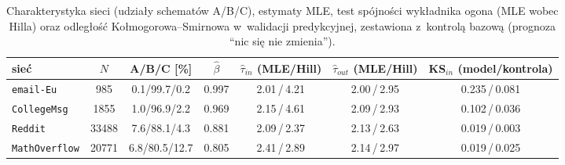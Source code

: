 \begin{table}[htbp]
    \centering
    \caption{Charakterystyka sieci (udziały schematów A/B/C), estymaty MLE, test spójności wykładnika ogona (MLE wobec Hilla) oraz odległość Kołmogorowa--Smirnowa w~walidacji predykcyjnej, zestawiona z~kontrolą bazową (prognoza \enquote{nic się nie zmienia}).}
    \label{tab:real-summary}
    \small
    \begin{tabular}{lcccccc}
        \toprule
        sieć & $N$ & A/B/C [\%] & $\hat\beta$ & $\hat\tau_{in}$ (MLE/Hill) & $\hat\tau_{out}$ (MLE/Hill) & KS$_{in}$ (model/kontrola) \\
        \midrule
        \texttt{email-Eu} & 985 & 0.1/99.7/0.2 & 0.997 & 2.01\,/\,4.21 & 2.00\,/\,2.95 & 0.235\,/\,0.081 \\
        \texttt{CollegeMsg} & 1855 & 1.0/96.9/2.2 & 0.969 & 2.15\,/\,4.61 & 2.09\,/\,2.93 & 0.102\,/\,0.036 \\
        \texttt{Reddit} & 33488 & 7.6/88.1/4.3 & 0.881 & 2.09\,/\,2.37 & 2.13\,/\,2.63 & 0.019\,/\,0.003 \\
        \texttt{MathOverflow} & 20771 & 6.8/80.5/12.7 & 0.805 & 2.41\,/\,2.89 & 2.14\,/\,2.97 & 0.019\,/\,0.025 \\
        \bottomrule
    \end{tabular}
\end{table}
